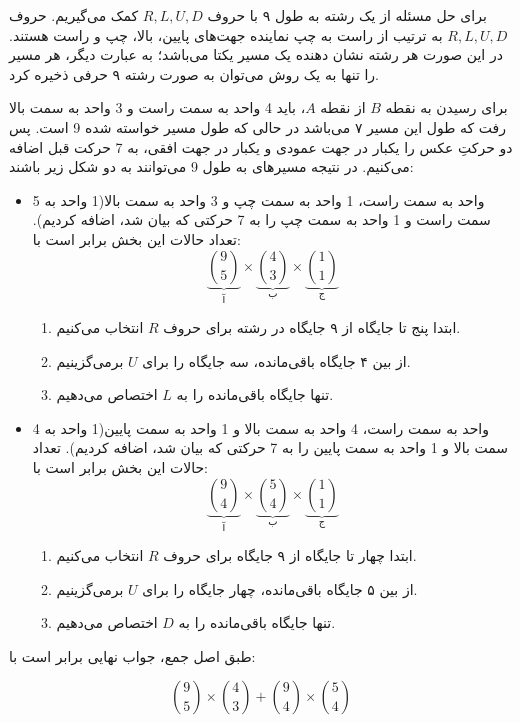\p
برای حل مسئله از یک رشته به طول ۹ با حروف
$R, L, U, D$
کمک می‌گیریم.
حروف 
$R, L, U, D$
به ترتیب از راست به چپ نماینده جهت‌های پایین، بالا، چپ و راست هستند.
در این صورت هر رشته نشان دهنده یک مسیر یکتا می‌باشد؛ به عبارت دیگر، هر مسیر را تنها به یک روش می‌توان به صورت رشته ۹ حرفی ذخیره کرد.

\p
برای رسیدن به نقطه $B$ از نقطه 
$A$، 
باید 4 واحد به سمت راست و 3 واحد به سمت بالا رفت که طول این مسیر ۷ می‌باشد
در حالی که طول مسیر خواسته شده 9 است. پس دو حرکتِ عکس را یکبار در جهت عمودی و یکبار در جهت افقی، به 7 حرکت قبل اضافه می‌کنیم. در نتیجه مسیر‌های به طول 9 می‌توانند به دو شکل زیر باشند:

\begin{itemize}
\item
5 واحد به سمت راست، 1 واحد به سمت چپ و 3 واحد به سمت بالا(1 واحد به سمت راست و 1 واحد به سمت چپ را به 7 حرکتی که بیان شد، اضافه کردیم).
تعداد حالات این بخش برابر است با:
$$\underbrace{\binom{9}{5}}_{\text{آ}}\times \underbrace{\binom{4}{3}}_{\text{ب}} \times \underbrace{\binom{1}{1}}_{\text{ج}}$$
\begin{enumerate}
\item 
ابتدا
پنج تا جایگاه از ۹ جایگاه در رشته برای حروف 
$R$
انتخاب می‌کنیم.
\item
 از بین ۴ جایگاه باقی‌مانده، سه جایگاه را برای 
$U$
برمی‌گزینیم.
\item
 تنها جایگاه باقی‌مانده را به 
$L$
اختصاص می‌دهیم.
\end{enumerate}
\item
4 واحد به سمت راست، 4 واحد به سمت بالا و 1 واحد به سمت پایین(1 واحد به سمت بالا و 1 واحد به سمت پایین را به 7 حرکتی که بیان شد، اضافه کردیم).
تعداد حالات این بخش برابر است با:
$$\underbrace{\binom{9}{4}}_{\text{آ}}\times \underbrace{\binom{5}{4}}_{\text{ب}} \times \underbrace{\binom{1}{1}}_{\text{ج}}$$

\begin{enumerate}
\item
ابتدا
چهار تا جایگاه از ۹ جایگاه برای حروف 
$R$
انتخاب می‌کنیم.
\item
 از بین ۵ جایگاه باقی‌مانده، چهار جایگاه را برای 
$U$ 
برمی‌گزینیم.
\item
 تنها جایگاه باقی‌مانده را به 
$D$
 اختصاص می‌دهیم.
\end{enumerate}
\end{itemize}
\p
 طبق اصل جمع، جواب نهایی برابر است با:

$$\binom{9}{5} \times \binom{4}{3} + \binom{9}{4} \times \binom{5}{4}$$